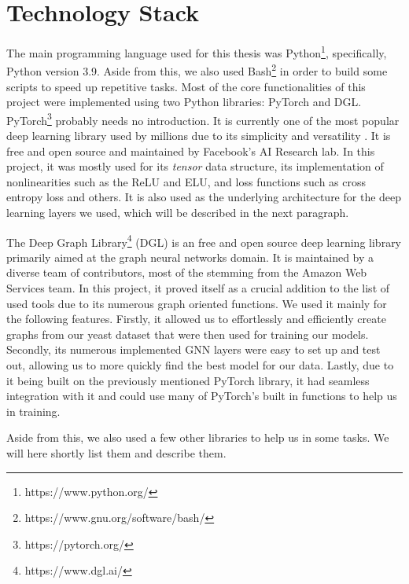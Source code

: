 \documentclass[times, utf8, diplomski, english]{fer_eng}
\begin{document}
\section{Technology Stack}
\label{sec:technology stack}

The main programming language used for this thesis was Python\footnote{https://www.python.org/}, specifically, Python version 3.9. Aside from this, we also used Bash\footnote{https://www.gnu.org/software/bash/} in order to build some scripts to speed up repetitive tasks. Most of the core functionalities of this project were implemented using two Python libraries: PyTorch and DGL. PyTorch\footnote{https://pytorch.org/} probably needs no introduction. It is currently one of the most popular deep learning library used by millions due to its simplicity and versatility \cite{popular_ml}. It is free and open source and maintained by Facebook's AI Research lab. In this project, it was mostly used for its \textit{tensor} data structure, its implementation of nonlinearities such as the ReLU and ELU, and loss functions such as cross entropy loss and others. It is also used as the underlying architecture for the deep learning layers we used, which will be described in the next paragraph.

The Deep Graph Library\footnote{https://www.dgl.ai/} (DGL) \cite{DGL} is an free and open source deep learning library primarily aimed at the graph neural networks domain. It is maintained by a diverse team of contributors, most of the stemming from the Amazon Web Services team. In this project, it proved itself as a crucial addition to the list of used tools due to its numerous graph oriented functions. We used it mainly for the following features. Firstly, it allowed us to effortlessly and efficiently create graphs from our yeast dataset that were then used for training our models. Secondly, its numerous implemented GNN layers were easy to set up and test out, allowing us to more quickly find the best model for our data. Lastly, due to it being built on the previously mentioned PyTorch library, it had seamless integration with it and could use many of PyTorch's built in functions to help us in training.

Aside from this, we also used a few other libraries to help us in some tasks. We will here shortly list them and describe them.
\end{document}
